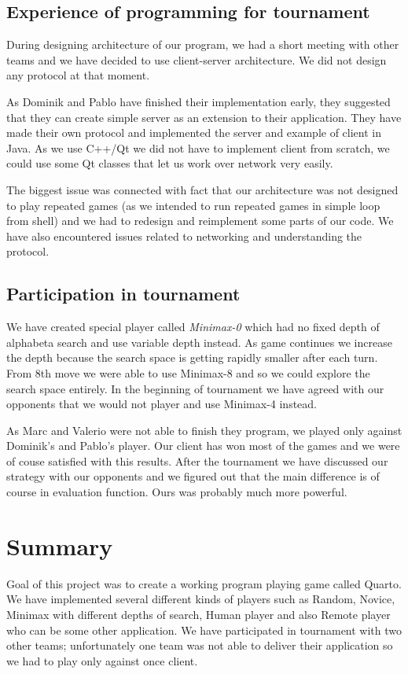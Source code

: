 \documentclass[paper=a4, fontsize=11pt]{article} %
\begin{document}
\subsection{Experience of programming for tournament}
During designing architecture of our program, we had a short  meeting with other teams and we have decided to use client-server architecture. 
We did not design any protocol at that moment.

As Dominik and Pablo have finished their implementation early, they suggested that they can create simple server as an extension to their application. 
They have made their own protocol and implemented the server and example of client in Java. 
As we use C++/Qt we did not have to implement client from scratch, we could use some Qt classes that let us work over network very easily. 

The biggest issue was connected with fact that our architecture was not designed to play repeated games (as we intended to run repeated games in simple loop from shell) and we had to redesign and reimplement some parts of our code. We have also encountered issues related to networking and understanding the protocol.

\subsection{Participation in tournament}
We have created special player called \emph{Minimax-0} which had no fixed depth of alphabeta search and use variable depth instead. As game continues we increase the depth because the search space is getting rapidly smaller after each turn. From 8th move we were able to use Minimax-8 and so we could explore the search space entirely. In the beginning of tournament we have agreed with our opponents that we would not player and use Minimax-4 instead.

As Marc and Valerio were not able to finish they program, we played only against Dominik's and Pablo's player. Our client has won most of the games and we were of couse satisfied with this results. After the tournament we have discussed our strategy with our opponents and we figured out that the main difference is of course in evaluation function. Ours was probably much more powerful.

\section{Summary}
Goal of this project was to create a working program playing game called Quarto. We have implemented several different kinds of players such as Random, Novice, Minimax with different depths of search, Human player and also Remote player who can be some other application. We have participated in tournament with two other teams; unfortunately one team was not able to deliver their application so we had to play only against once client. 
\end{document}
